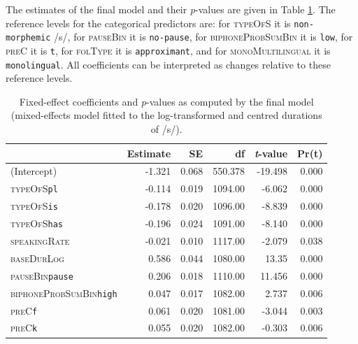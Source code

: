The estimates of the final model and their \textit{p}-values are given in Table \ref{tab:4.5}. The reference levels for the categorical predictors are: for \textsc{typeOfS} it is \texttt{non-morphemic} /s/, for \textsc{pauseBin} it is \texttt{no-pause}, for \textsc{biphoneProbSumBin} it is \texttt{low}, for \textsc{preC} it is \texttt{t}, for \textsc{folType} it is \texttt{approximant}, and for \textsc{monoMultilingual} it is \texttt{monolingual}. All coefficients can be interpreted as changes relative to these reference levels.

\begin{table}\fontsize{10}{11}
\caption{Fixed-effect coefficients and \textit{p}-values as computed by the final model (mixed-effects model fitted to the log-transformed and centred durations of /s/).}
\label{tab:4.5}
\centering
\begin{tabular}{lrrrrr} 
\lsptoprule
~                            & Estimate & SE    & df      & \textit{t}-value & Pr(\textbar{}t\textbar{})  \\ 
\midrule
(Intercept)                  & -1.321   & 0.068 & 550.378 & -19.498          & 0.000                      \\
\textsc{typeOfS}\texttt{pl}                    & -0.114   & 0.019 & 1094.00 & -6.062           & 0.000                      \\
\textsc{typeOfS}\texttt{is}                    & -0.178   & 0.020 & 1096.00 & -8.839           & 0.000                      \\
\textsc{typeOfS}\texttt{has}                   & -0.196   & 0.024 & 1091.00 & -8.140           & 0.000                      \\
\textsc{speakingRate}                 & -0.021   & 0.010 & 1117.00 & -2.079           & 0.038                      \\
\textsc{baseDurLog}                   & 0.586    & 0.044 & 1080.00 & 13.35            & 0.000                      \\
\textsc{pauseBin}\texttt{pause}                & 0.206    & 0.018 & 1110.00 & 11.456           & 0.000                      \\
\textsc{biphoneProbSumBin}\texttt{high}        & 0.047    & 0.017 & 1082.00 & 2.737            & 0.006                      \\
\textsc{preC}\texttt{f}                        & 0.061    & 0.020 & 1081.00 & -3.044           & 0.003                      \\
\textsc{preC}\texttt{k}                        & 0.055    & 0.020 & 1082.00 & -0.303           & 0.006                      \\

\end{tabular}
\end{table}
